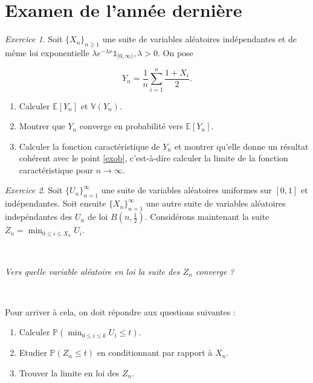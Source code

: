 \documentclass[french]{book}
\theoremstyle{definition}
\theoremstyle{remark}
\newtheorem{exo}{Exercice}
\newcommand{\biggg}{>}
\newcommand{\bg}{\biggg}
\begin{document}
\section*{Examen de l'année dernière}

\begin{exo}
  Soit \(\{ X_n \}_{n \geq 1}\) une suite de variables aléatoires indépendantes et de même loi exponentielle \(\lambda e^{-\lambda x} \mathds{1}_{[0,\infty)}, \lambda \bg 0\). On pose

  \[Y_n = \frac{1}{n}\sum_{i=1}^{n} \frac{1 + X_i}{2}.\]

  \begin{enumerate}
    \item Calculer \(\mathbb{E}[Y_n]\) et \(\mathbb{V}(Y_n)\).
    \item \label{exob} Montrer que \(Y_n\) converge en probabilité vers \(\mathbb{E}[Y_n]\).
    \item Calculer la fonction caractéristique de \(Y_n\) et montrer qu'elle donne un résultat cohérent avec le point \ref{exob}, c'est-à-dire calculer la limite de la fonction caractéristique pour \(n \longrightarrow \infty\).
  \end{enumerate}
\end{exo}

\begin{exo}
  Soit \(\{ U_n \}_{n=1}^{\infty}\) une suite de variables aléatoires uniformes sur \([0, 1]\) et indépendantes. Soit ensuite \(\{ X_n \}_{n=1}^{\infty}\) une autre suite de variables aléatoires indepéndantes des \(U_n\) de loi \(B\left(n, \frac{1}{2}\right)\). Considérons maintenant la suite \(Z_n = \displaystyle\min _{0 \leq i \leq X_n} U_i\).

  \

  \emph{Vers quelle variable aléatoire en loi la suite des \(Z_n\) converge ?}

  \

  Pour arriver à cela, on doit répondre aux questions suivantes :

  \begin{enumerate}
    \item Calculer \(\mathbb{P}\left(\displaystyle\min _{0 \leq  i \leq k} U_i \leq t\right)\).
    \item Etudier \(\mathbb{P}(Z_n \leq t)\) en conditionnant par rapport à \(X_n\).
    \item Trouver la limite en loi des \(Z_n\).
  \end{enumerate}
\end{exo}
\end{document}

